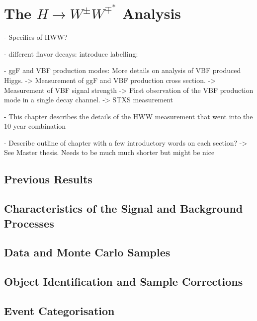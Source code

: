 \chapter{The $H\rightarrow W^{\pm}W^{\mp^*}$ Analysis}
\label{chap:hww}

- Specifics of HWW?

- different flavor decays: introduce labelling: \HWWdet 

- ggF and VBF production modes: More details on analysis of VBF produced Higgs. 
    -> Measurement of ggF and VBF production cross section.
    -> Measurement of VBF signal strength -> First observation of the VBF production mode in a single decay channel. 
    -> STXS measurement

- This chapter describes the details of the HWW measurement that went into the 10 year combination

- Describe outline of chapter with a few introductory words on each section?
    -> See Master thesis. Needs to be much much shorter but might be nice



\section{Previous Results}
\label{sec:prev-results}



\section{Characteristics of the Signal and Background Processes}
\label{sec:signal-bkg-characteristics}



\section{Data and Monte Carlo Samples}
\label{sec:data-mc-samples}



\section{Object Identification and Sample Corrections}
\label{sec:object-selection}



\section{Event Categorisation}
\label{sec:event-categorisation}



